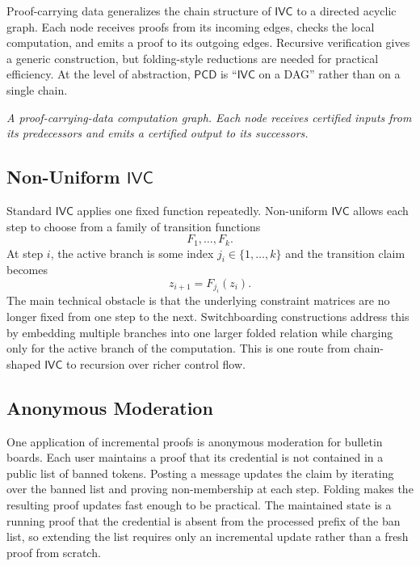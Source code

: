 \documentclass[11pt]{article}
\newcommand{\IVC}{\ensuremath{\mathsf{IVC}}}
\newcommand{\PCD}{\ensuremath{\mathsf{PCD}}}
\begin{document}
Proof-carrying data generalizes the chain structure of $\IVC$ to a directed
acyclic graph.  Each node receives proofs from its incoming edges, checks the
local computation, and emits a proof to its outgoing edges.  Recursive
verification gives a generic construction, but folding-style reductions are
needed for practical efficiency.  At the level of abstraction, $\PCD$ is
``$\IVC$ on a DAG'' rather than on a single chain.

\begin{center}

\smallskip
\emph{A proof-carrying-data computation graph.  Each node receives certified
inputs from its predecessors and emits a certified output to its successors.}
\end{center}

\subsection{Non-Uniform \texorpdfstring{$\IVC$}{IVC}}

Standard $\IVC$ applies one fixed function repeatedly.  Non-uniform $\IVC$
allows each step to choose from a family of transition functions
\[
  F_1,\ldots,F_k.
\]
At step $i$, the active branch is some index $j_i \in \{1,\ldots,k\}$ and the
transition claim becomes
\[
  z_{i+1}=F_{j_i}(z_i).
\]
The main technical obstacle is that the underlying constraint matrices are no
longer fixed from one step to the next.  Switchboarding constructions address
this by embedding multiple branches into one larger folded relation while
charging only for the active branch of the computation.  This is one route from
chain-shaped $\IVC$ to recursion over richer control flow.

\subsection{Anonymous Moderation}

One application of incremental proofs is anonymous moderation for bulletin
boards.  Each user maintains a proof that its credential is not contained in a
public list of banned tokens.  Posting a message updates the claim by iterating
over the banned list and proving non-membership at each step.  Folding makes
the resulting proof updates fast enough to be practical.  The maintained state
is a running proof that the credential is absent from the processed prefix of
the ban list, so extending the list requires only an incremental update rather
than a fresh proof from scratch.
\end{document}
